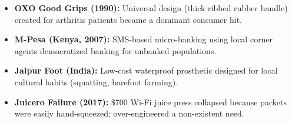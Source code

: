 \begin{casebox}
\begin{itemize}[leftmargin=1.2em, itemsep=3pt]
    \item \textbf{OXO Good Grips (1990):} Universal design (thick ribbed rubber handle) created for arthritis patients became a dominant consumer hit.
    \item \textbf{M-Pesa (Kenya, 2007):} SMS-based micro-banking using local corner agents democratized banking for unbanked populations.
    \item \textbf{Jaipur Foot (India):} Low-cost waterproof prosthetic designed for local cultural habits (squatting, barefoot farming).
    \item \textbf{Juicero Failure (2017):} \$700 Wi-Fi juice press collapsed because packets were easily hand-squeezed; over-engineered a non-existent need.
\end{itemize}
\end{casebox}
